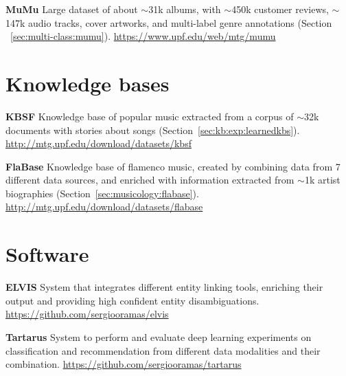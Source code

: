 \vspace{0.2cm}

\noindent \textbf{MuMu} Large dataset of about $\sim$31k albums, with $\sim$450k customer reviews, $\sim$147k audio tracks, cover artworks, and multi-label genre annotations (Section ~\ref{sec:multi-class:mumu}). \url{https://www.upf.edu/web/mtg/mumu}

\section{Knowledge bases}

\noindent \textbf{KBSF} Knowledge base of popular music extracted from a corpus of $\sim$32k documents with stories about songs (Section~\ref{sec:kb:exp:learnedkbs}). \url{http://mtg.upf.edu/download/datasets/kbsf}

\vspace{0.2cm}

\noindent \textbf{FlaBase} Knowledge base of flamenco music, created by combining data from 7 different data sources, and enriched with information extracted from $\sim$1k artist biographies (Section~\ref{sec:musicology:flabase}). \url{http://mtg.upf.edu/download/datasets/flabase}


\section{Software}

\noindent \textbf{ELVIS} System that integrates different entity linking tools, enriching their output and providing high confident entity disambiguations. \url{https://github.com/sergiooramas/elvis}

\vspace{0.2cm}

\noindent \textbf{Tartarus} System to perform and evaluate deep learning experiments on classification and recommendation from different data modalities and their combination. \url{https://github.com/sergiooramas/tartarus}
 